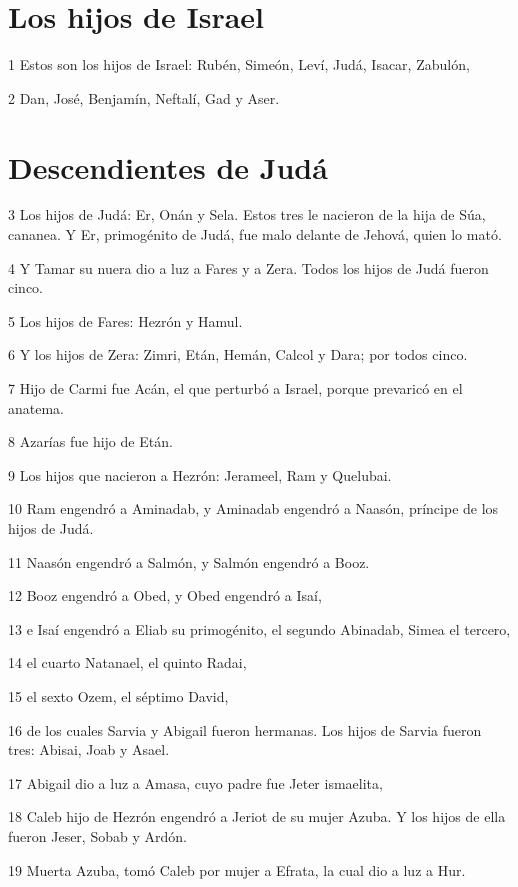 \section*{Los hijos de Israel}

\par 1 Estos son los hijos de Israel: Rubén, Simeón, Leví, Judá, Isacar, Zabulón,
\par 2 Dan, José, Benjamín, Neftalí, Gad y Aser.

\section*{Descendientes de Judá}

\par 3 Los hijos de Judá: Er, Onán y Sela. Estos tres le nacieron de la hija de Súa, cananea. Y Er, primogénito de Judá, fue malo delante de Jehová, quien lo mató.
\par 4 Y Tamar su nuera dio a luz a Fares y a Zera. Todos los hijos de Judá fueron cinco.
\par 5 Los hijos de Fares: Hezrón y Hamul.
\par 6 Y los hijos de Zera: Zimri, Etán, Hemán, Calcol y Dara; por todos cinco.
\par 7 Hijo de Carmi fue Acán, el que perturbó a Israel, porque prevaricó en el anatema.
\par 8 Azarías fue hijo de Etán.
\par 9 Los hijos que nacieron a Hezrón: Jerameel, Ram y Quelubai.
\par 10 Ram engendró a Aminadab, y Aminadab engendró a Naasón, príncipe de los hijos de Judá.
\par 11 Naasón engendró a Salmón, y Salmón engendró a Booz.
\par 12 Booz engendró a Obed, y Obed engendró a Isaí,
\par 13 e Isaí engendró a Eliab su primogénito, el segundo Abinadab, Simea el tercero,
\par 14 el cuarto Natanael, el quinto Radai,
\par 15 el sexto Ozem, el séptimo David, 
\par 16 de los cuales Sarvia y Abigail fueron hermanas. Los hijos de Sarvia fueron tres: Abisai, Joab y Asael.
\par 17 Abigail dio a luz a Amasa, cuyo padre fue Jeter ismaelita,
\par 18 Caleb hijo de Hezrón engendró a Jeriot de su mujer Azuba. Y los hijos de ella fueron Jeser, Sobab y Ardón.
\par 19 Muerta Azuba, tomó Caleb por mujer a Efrata, la cual dio a luz a Hur.
